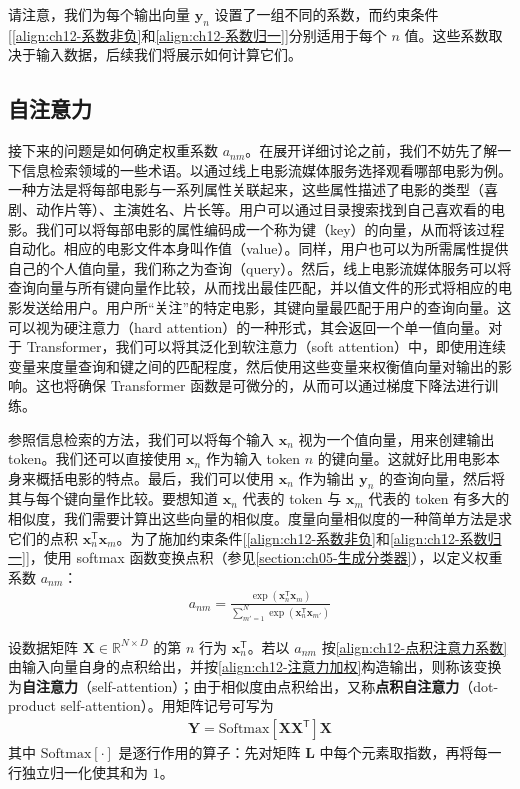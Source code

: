 \documentclass[../../main.tex]{subfiles}
\begin{document}
请注意，我们为每个输出向量 $\mathbf{y}_n$ 设置了一组不同的系数，而约束条件[\eqref{align:ch12-系数非负}和\eqref{align:ch12-系数归一}]分别适用于每个 $n$ 值。这些系数取决于输入数据，后续我们将展示如何计算它们。

\subsection{自注意力}\label{subsection:ch12-自注意力}

接下来的问题是如何确定权重系数 $a_{nm}$。在展开详细讨论之前，我们不妨先了解一下信息检索领域的一些术语。以通过线上电影流媒体服务选择观看哪部电影为例。一种方法是将每部电影与一系列属性关联起来，这些属性描述了电影的类型（喜剧、动作片等）、主演姓名、片长等。用户可以通过目录搜索找到自己喜欢看的电影。我们可以将每部电影的属性编码成一个称为键（key）的向量，从而将该过程自动化。相应的电影文件本身叫作值（value）。同样，用户也可以为所需属性提供自己的个人值向量，我们称之为查询（query）。然后，线上电影流媒体服务可以将查询向量与所有键向量作比较，从而找出最佳匹配，并以值文件的形式将相应的电影发送给用户。用户所“关注”的特定电影，其键向量最匹配于用户的查询向量。这可以视为硬注意力（hard attention）的一种形式，其会返回一个单一值向量。对于 Transformer，我们可以将其泛化到软注意力（soft attention）中，即使用连续变量来度量查询和键之间的匹配程度，然后使用这些变量来权衡值向量对输出的影响。这也将确保 Transformer 函数是可微分的，从而可以通过梯度下降法进行训练。

参照信息检索的方法，我们可以将每个输入 $\mathbf{x}_n$ 视为一个值向量，用来创建输出 token。我们还可以直接使用 $\mathbf{x}_n$ 作为输入 token $n$ 的键向量。这就好比用电影本身来概括电影的特点。最后，我们可以使用 $\mathbf{x}_n$ 作为输出 $\mathbf{y}_n$ 的查询向量，然后将其与每个键向量作比较。要想知道 $\mathbf{x}_n$ 代表的 token 与 $\mathbf{x}_m$ 代表的 token 有多大的相似度，我们需要计算出这些向量的相似度。度量向量相似度的一种简单方法是求它们的点积 $\mathbf{x}_n^{\mathsf{T}}\mathbf{x}_m$。为了施加约束条件[\eqref{align:ch12-系数非负}和\eqref{align:ch12-系数归一}]，使用 softmax 函数变换点积（参见\cref{section:ch05-生成分类器}），以定义权重系数 $a_{nm}$：
\begin{align}
a_{nm}=\frac{\exp\left(\mathbf{x}_n^{\mathsf{T}}\mathbf{x}_m\right)}{\sum_{m'=1}^{N}\exp\left(\mathbf{x}_n^{\mathsf{T}}\mathbf{x}_{m'}\right)}
\label{align:ch12-点积注意力系数}
\end{align}

\begin{definition}[点积自注意力]\label{definition:ch12-点积自注意力}
设数据矩阵 $\mathbf{X}\in\mathbb{R}^{N\times D}$ 的第 $n$ 行为 $\mathbf{x}_n^{\mathsf{T}}$。若以 $a_{nm}$ 按\eqref{align:ch12-点积注意力系数}由输入向量自身的点积给出，并按\eqref{align:ch12-注意力加权}构造输出，则称该变换为\textbf{自注意力}（self-attention）；由于相似度由点积给出，又称\textbf{点积自注意力}（dot-product self-attention）。用矩阵记号可写为
\begin{align}
\mathbf{Y}=\mathrm{Softmax}\left[\mathbf{X}\mathbf{X}^{\mathsf{T}}\right]\mathbf{X}
\label{align:ch12-点积自注意力矩阵}
\end{align}
其中 $\mathrm{Softmax}[\cdot]$ 是逐行作用的算子：先对矩阵 $\mathbf{L}$ 中每个元素取指数，再将每一行独立归一化使其和为 $1$。
\end{definition}
\end{document}
